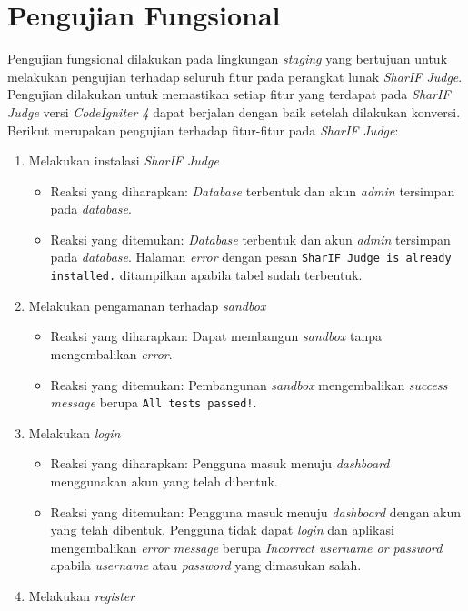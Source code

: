 \section{Pengujian Fungsional}
Pengujian fungsional dilakukan pada lingkungan \textit{staging} yang bertujuan untuk melakukan pengujian terhadap seluruh fitur pada perangkat lunak \textit{SharIF Judge}. Pengujian dilakukan untuk memastikan setiap fitur yang terdapat pada \textit{SharIF Judge} versi \textit{CodeIgniter 4} dapat berjalan dengan baik setelah dilakukan konversi. Berikut merupakan pengujian terhadap fitur-fitur pada \textit{SharIF Judge}:
\begin{enumerate}
	\item Melakukan instalasi \textit{SharIF Judge}
		\begin{itemize}
			\item Reaksi yang diharapkan: \textit{Database} terbentuk dan akun \textit{admin} tersimpan pada \textit{database}. 
			\item Reaksi yang ditemukan: \textit{Database} terbentuk dan akun \textit{admin} tersimpan pada \textit{database}. Halaman \textit{error} dengan pesan \texttt{SharIF Judge is already installed.} ditampilkan apabila tabel sudah terbentuk.
		\end{itemize}
	\item Melakukan pengamanan terhadap \textit{sandbox}
	\begin{itemize}
		\item Reaksi yang diharapkan: Dapat membangun \textit{sandbox} tanpa mengembalikan \textit{error}.
		\item Reaksi yang ditemukan: Pembangunan \textit{sandbox} mengembalikan \textit{success message} berupa \texttt{All tests passed!}.
	\end{itemize}
	\item Melakukan \textit{login}
		\begin{itemize}
			\item Reaksi yang diharapkan: Pengguna masuk menuju \textit{dashboard} menggunakan akun yang telah dibentuk.
			\item Reaksi yang ditemukan: Pengguna masuk menuju \textit{dashboard} dengan akun yang telah dibentuk. Pengguna tidak dapat \textit{login} dan aplikasi mengembalikan \textit{error message} berupa \textit{Incorrect username or password} apabila \textit{username} atau \textit{password} yang dimasukan salah.
		\end{itemize}
	\item Melakukan \textit{register}

\end{enumerate}
